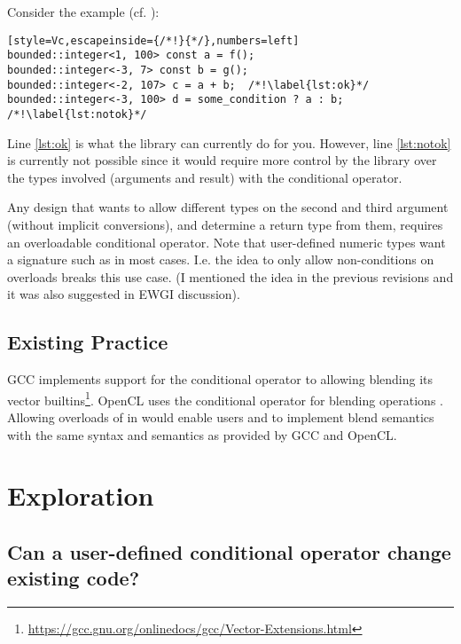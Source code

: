 Consider the  example (cf. \cite{site.bounded-integer}):
\smallskip\begin{lstlisting}[style=Vc,escapeinside={/*!}{*/},numbers=left]
bounded::integer<1, 100> const a = f();
bounded::integer<-3, 7> const b = g();
bounded::integer<-2, 107> c = a + b;  /*!\label{lst:ok}*/
bounded::integer<-3, 100> d = some_condition ? a : b;  /*!\label{lst:notok}*/
\end{lstlisting}

Line \ref{lst:ok} is what the  library can currently do for you.
However, line \ref{lst:notok} is currently not possible since it would require more control by the library over the types involved (arguments and result) with the conditional operator.

Any design that wants to allow different types on the second and third argument (without implicit conversions), and determine a return type from them, requires an overloadable conditional operator.
Note that user-defined numeric types want a signature such as  in most cases.
I.e. the idea to only allow non-\bool conditions on  overloads breaks this use case.
(I mentioned the idea in the previous revisions and it was also suggested in EWGI discussion).

\subsection{Existing Practice}
GCC implements support for the conditional operator to allowing blending its vector builtins\footnote{\url{https://gcc.gnu.org/onlinedocs/gcc/Vector-Extensions.html}}.
OpenCL uses the conditional operator for blending operations \cite{spec.opencl1.1}.
Allowing overloads of  in \CC{} would enable users and  to implement blend semantics with the same syntax and semantics as provided by GCC and OpenCL.

\section{Exploration}

\subsection{Can a user-defined conditional operator change existing code?}

